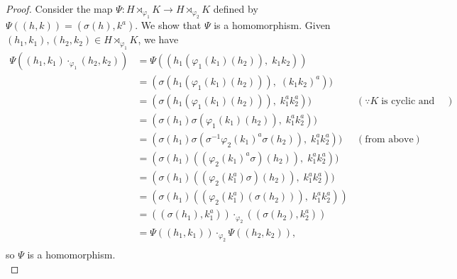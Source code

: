\documentclass{article}
\begin{document}
\begin{enumerate}[label={\bf Q\arabic*:}]
\begin{proof}
      Consider the map $\Psi:H\rtimes_{\varphi_1}K\rightarrow
      H\rtimes_{\varphi_2}K$ defined by $\Psi((h,k))=(\sigma(h),k^a)$. We
      show that $\Psi$ is a homomorphism. Given $(h_1,k_1),(h_2,k_2)\in
      H\rtimes_{\varphi_1}K$, we have
      \begin{align*}
        \Psi((h_1,k_1)\cdot_{\varphi_1}(h_2,k_2)) &=
          \Psi((h_1(\varphi_1(k_1)(h_2)),\;
          k_1k_2)) & \\
          &= (\sigma(h_1(\varphi_1(k_1)(h_2))),\; (k_1k_2)^a)) & \\
          &= (\sigma(h_1(\varphi_1(k_1)(h_2))),\; k_1^ak_2^a)) & (\because K\;
          \text{is cyclic and hence abelian}) \\
          &= (\sigma(h_1)\sigma(\varphi_1(k_1)(h_2)),\; k_1^ak_2^a)) & \\
          &= (\sigma(h_1)\sigma(\sigma^{-1}\varphi_2(k_1)^a\sigma(h_2)),\;
          k_1^ak_2^a)) & (\text{from above}) \\
          &= (\sigma(h_1)((\varphi_2(k_1)^a\sigma)(h_2)),\; k_1^ak_2^a)) & \\
          &= (\sigma(h_1)((\varphi_2(k_1^a)\sigma)(h_2)),\; k_1^ak_2^a)) & \\
          &= (\sigma(h_1)((\varphi_2(k_1^a)(\sigma(h_2))),\; k_1^ak_2^a)) & \\
          &= ((\sigma(h_1),k_1^a)) \cdot_{\varphi_2} ((\sigma(h_2),k_2^a)) & \\
          &= \Psi((h_1,k_1)) \cdot_{\varphi_2} \Psi((h_2,k_2)), & \\
      \end{align*}
      so $\Psi$ is a homomorphism. \\


\end{proof}
\end{enumerate}
\end{document}
